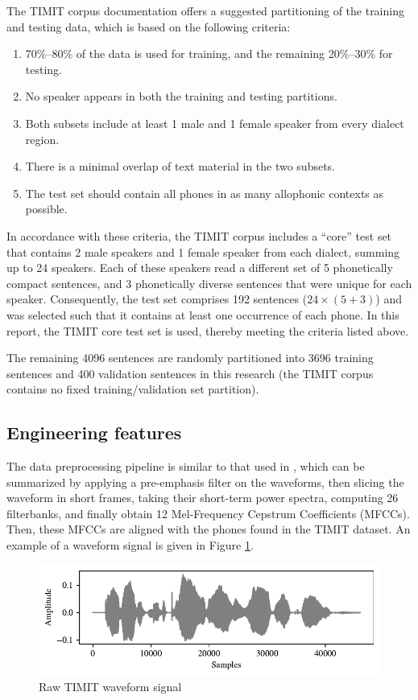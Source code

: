 		The TIMIT corpus documentation offers a suggested partitioning of the training and testing data, which is based on the following criteria:
		\begin{enumerate}
			\item 70\%--80\% of the data is used for training, and the remaining 20\%--30\% for testing.
			\item No speaker appears in both the training and testing partitions.
			\item Both subsets include at least 1 male and 1 female speaker from every dialect region.
			\item There is a minimal overlap of text material in the two subsets.
			\item The test set should contain all phones in as many allophonic contexts as possible.
		\end{enumerate}
		In accordance with these criteria, the TIMIT corpus includes a ``core'' test set that contains 2 male speakers and 1 female speaker from each dialect, summing up to 24 speakers.
		Each of these speakers read a different set of 5 phonetically compact sentences, and 3 phonetically diverse sentences that were unique for each speaker.
		Consequently, the test set comprises 192 sentences ($24\times(5+3)$) and was selected such that it contains at least one occurrence of each phone.
		In this report, the TIMIT core test set is used, thereby meeting the criteria listed above.

		The remaining 4096 sentences are randomly partitioned into 3696 training sentences and 400 validation sentences in this research (the TIMIT corpus contains no fixed training/validation set partition).

	\subsection{Engineering features}

		The data preprocessing pipeline is similar to that used in \citet{fayek2016}, which can be summarized by applying a pre-emphasis filter on the waveforms, then slicing the waveform in short frames, taking their short-term power spectra, computing 26 filterbanks, and finally obtain 12 Mel-Frequency Cepstrum Coefficients (MFCCs).
		Then, these MFCCs are aligned with the phones found in the TIMIT dataset.
		An example of a waveform signal is given in Figure \ref{fig:signal}.
			\begin{figure}[ht]
				\centering
			    \includegraphics[width=\linewidth]{gfx/signal}
			    \caption{Raw TIMIT waveform signal}
			    \label{fig:signal}
			\end{figure}

